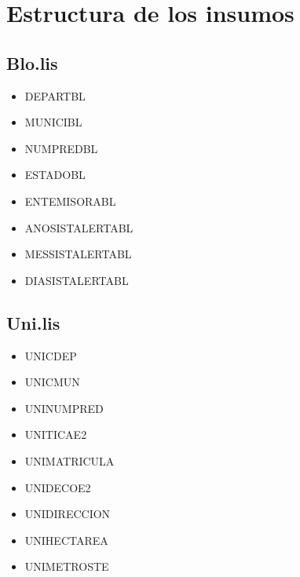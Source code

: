 \documentclass[letterpaper,10pt,spanish]{sphinxmanual}
\begin{document}
\section{Estructura de los insumos}
\label{\detokenize{ETL_Cobol/Structure:estructura-de-los-insumos}}\label{\detokenize{ETL_Cobol/Structure::doc}}

\subsection{Blo.lis}
\label{\detokenize{ETL_Cobol/Structure:blo-lis}}\begin{itemize}
\item {} 
DEPART\sphinxhyphen{}BL

\item {} 
MUNICI\sphinxhyphen{}BL

\item {} 
NUMPRED\sphinxhyphen{}BL

\item {} 
ESTADO\sphinxhyphen{}BL

\item {} 
ENT\sphinxhyphen{}EMISORA\sphinxhyphen{}BL

\item {} 
ANO\sphinxhyphen{}SIST\sphinxhyphen{}ALERTA\sphinxhyphen{}BL

\item {} 
MES\sphinxhyphen{}SIST\sphinxhyphen{}ALERTA\sphinxhyphen{}BL

\item {} 
DIA\sphinxhyphen{}SIST\sphinxhyphen{}ALERTA\sphinxhyphen{}BL

\end{itemize}


\subsection{Uni.lis}
\label{\detokenize{ETL_Cobol/Structure:uni-lis}}\begin{itemize}
\item {} 
UNI\sphinxhyphen{}CDEP

\item {} 
UNI\sphinxhyphen{}CMUN

\item {} 
UNI\sphinxhyphen{}NUMPRED

\item {} 
UNI\sphinxhyphen{}TICA\sphinxhyphen{}E2

\item {} 
UNI\sphinxhyphen{}MATRICULA

\item {} 
UNI\sphinxhyphen{}DECO\sphinxhyphen{}E2

\item {} 
UNI\sphinxhyphen{}DIRECCION

\item {} 
UNI\sphinxhyphen{}HECTAREA

\item {} 
UNI\sphinxhyphen{}METROSTE

\end{itemize}
\end{document}
